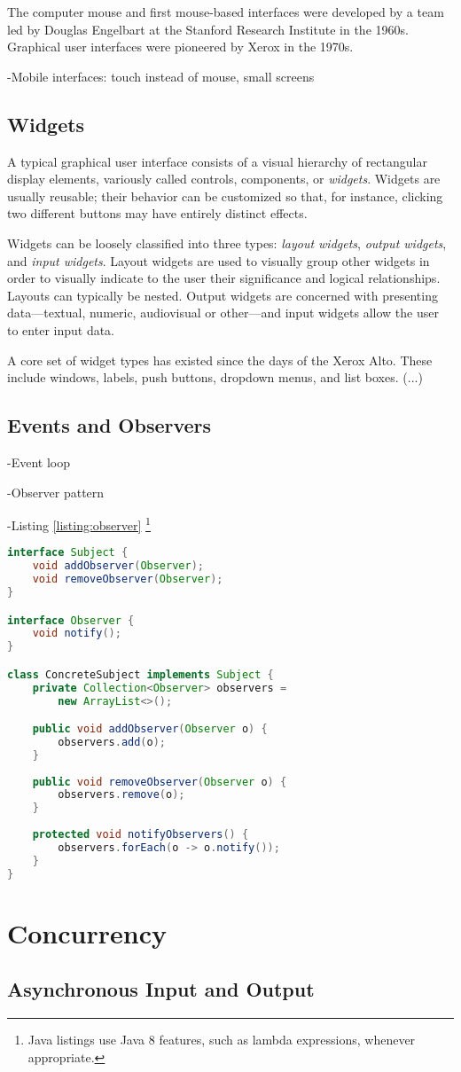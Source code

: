 The computer mouse and first mouse-based interfaces were developed by a team led by Douglas Engelbart at the Stanford Research Institute in the \num{1960s}. Graphical user interfaces were pioneered by Xerox in the \num{1970s}.

-Mobile interfaces: touch instead of mouse, small screens

\subsection{Widgets}

A typical graphical user interface consists of a visual hierarchy of rectangular display elements, variously called controls, components, or \emph{widgets}. Widgets are usually reusable; their behavior can be customized so that, for instance, clicking two different buttons may have entirely distinct effects.

Widgets can be loosely classified into three types: \emph{layout widgets}, \emph{output widgets}, and \emph{input widgets}. Layout widgets are used to visually group other widgets in order to visually indicate to the user their significance and logical relationships. Layouts can typically be nested. Output widgets are concerned with presenting data---textual, numeric, audiovisual or other---and input widgets allow the user to enter input data.

A core set of widget types has existed since the days of the Xerox Alto. These include windows, labels, push buttons, dropdown menus, and list boxes. (...)

\subsection{Events and Observers}

-Event loop

-Observer pattern \cite{GoF}

-Listing \ref{listing:observer} \footnote{Java listings use Java 8 features, such as lambda expressions, whenever appropriate.}

\begin{code}
\begin{lstlisting}[language=Java,caption=An implementation of the observer pattern in Java 8.\label{listing:observer}]
interface Subject {
    void addObserver(Observer);
    void removeObserver(Observer);
}

interface Observer {
    void notify();
}

class ConcreteSubject implements Subject {
    private Collection<Observer> observers = 
        new ArrayList<>();

    public void addObserver(Observer o) {
        observers.add(o);
    }
    
    public void removeObserver(Observer o) {
        observers.remove(o);
    }
    
    protected void notifyObservers() {
        observers.forEach(o -> o.notify());
    }
}
\end{lstlisting}
\end{code}

\section{Concurrency}

\subsection{Asynchronous Input and Output}
